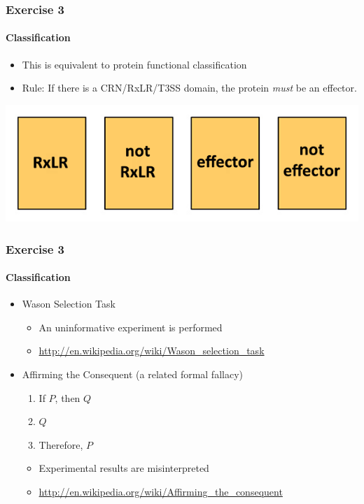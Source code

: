 \documentclass[table]{beamer}
\begin{document}
  \begin{frame}
    \frametitle{Exercise 3}
    \framesubtitle{Classification}
    \begin{itemize}
      \item This is equivalent to protein functional classification
      \item Rule: If there is a CRN/RxLR/T3SS domain, the protein \textit{must} be an effector.
    \end{itemize}
    \includegraphics[width=\textwidth]{images/wason_rxlr}
  \end{frame}
  
  \begin{frame}
    \frametitle{Exercise 3}
    \framesubtitle{Classification}
    \begin{itemize}
      \item Wason Selection Task
      \begin{itemize}
        \item An uninformative experiment is performed
        \item \url{http://en.wikipedia.org/wiki/Wason_selection_task}
      \end{itemize}
      \item Affirming the Consequent (a related formal fallacy)
      \begin{enumerate}
       \item If $P$, then $Q$
       \item $Q$
       \item Therefore, $P$
      \end{enumerate}
      \begin{itemize}
        \item Experimental results are misinterpreted
        \item \url{http://en.wikipedia.org/wiki/Affirming_the_consequent}
      \end{itemize}
    \end{itemize}
  \end{frame}
\end{document}
